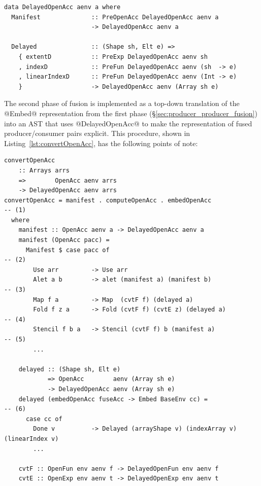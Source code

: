 \begin{lstlisting}[style=haskell_float
    ,name=DelayedOpenAcc
    ,label=lst:DelayedOpenAcc
    ,caption={Representation of delayed arrays}]
data DelayedOpenAcc aenv a where
  Manifest              :: PreOpenAcc DelayedOpenAcc aenv a
                        -> DelayedOpenAcc aenv a

  Delayed               :: (Shape sh, Elt e) =>
    { extentD           :: PreExp DelayedOpenAcc aenv sh
    , indexD            :: PreFun DelayedOpenAcc aenv (sh  -> e)
    , linearIndexD      :: PreFun DelayedOpenAcc aenv (Int -> e)
    }                   -> DelayedOpenAcc aenv (Array sh e)
\end{lstlisting}

The second phase of fusion is implemented as a top-down translation of the
@Embed@ representation from the first phase
(\S\ref{sec:producer_producer_fusion}) into an AST that uses @DelayedOpenAcc@ to
make the representation of fused producer/consumer pairs explicit. This
procedure, shown in Listing~\ref{lst:convertOpenAcc}, has the following points
of note:

\begin{lstlisting}[style=haskell_float,
    label=lst:convertOpenAcc,
    caption={Consumer fusion via top-down annotation of the AST}]
convertOpenAcc
    :: Arrays arrs
    =>        OpenAcc aenv arrs
    -> DelayedOpenAcc aenv arrs
convertOpenAcc = manifest . computeOpenAcc . embedOpenAcc                              -- (1)
  where
    manifest :: OpenAcc aenv a -> DelayedOpenAcc aenv a
    manifest (OpenAcc pacc) =
      Manifest $ case pacc of                                                          -- (2)
        Use arr         -> Use arr
        Alet a b        -> alet (manifest a) (manifest b)                              -- (3)
        Map f a         -> Map  (cvtF f) (delayed a)
        Fold f z a      -> Fold (cvtF f) (cvtE z) (delayed a)                          -- (4)
        Stencil f b a   -> Stencil (cvtF f) b (manifest a)                             -- (5)
        ...

    delayed :: (Shape sh, Elt e)
            => OpenAcc        aenv (Array sh e)
            -> DelayedOpenAcc aenv (Array sh e)
    delayed (embedOpenAcc fuseAcc -> Embed BaseEnv cc) =                               -- (6)
      case cc of
        Done v          -> Delayed (arrayShape v) (indexArray v) (linearIndex v)
        ...

    cvtF :: OpenFun env aenv f -> DelayedOpenFun env aenv f
    cvtE :: OpenExp env aenv t -> DelayedOpenExp env aenv t
\end{lstlisting}


